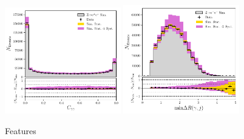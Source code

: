 \begin{figure}[h!]
\begin{center}
    \end{center}
    \begin{center}
        \includegraphics[width=0.45\textwidth]{figures/appendix_zee/centrality_zee_LPS.pdf}
        \includegraphics[width=0.45\textwidth]{figures/appendix_zee/min_delta_r_jgam_zee_LPS.pdf}
    \end{center}
    \caption{Features}
\end{figure}

